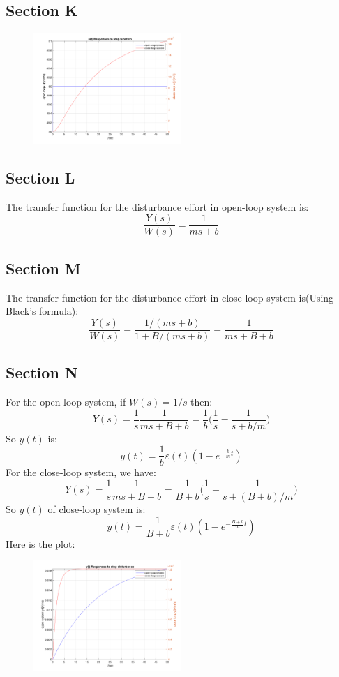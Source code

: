 \documentclass[a4paper]{article}
\begin{document}
\subsection{Section K}
\begin{figure}[H]
\centering
\includegraphics[width = 0.5\textwidth]{pic/k.png}
\end{figure}

\subsection{Section L}
The transfer function for the disturbance effort in open-loop system is:
$$
\frac{Y(s)}{W(s)} = \frac{1}{ms+b}
$$

\subsection{Section M}
The transfer function for the disturbance effort in close-loop system is(Using Black's formula):
$$
\frac{Y(s)}{W(s)} = \frac{1/(ms+b)}{1+B/(ms+b)} = \frac{1}{ms+B+b}
$$

\subsection{Section N}
For the open-loop system, if $W(s) = 1/s$ then:
$$
Y(s) = \frac1s\frac{1}{ms+B+b} = \frac{1}{b}\Big(\frac 1s -\frac{1}{s+b/m}\Big)
$$
So $y(t)$ is:
$$
y(t) = \frac 1b\varepsilon(t)(1-e^{-\frac bm t})
$$
For the close-loop system, we have:
$$
Y(s) = \frac 1s\frac{1}{ms+B+b} = \frac{1}{B+b} \Big(\frac 1s -\frac{1}{s+(B+b)/m}\Big)
$$
So $y(t)$ of close-loop system is:
$$
y(t) = \frac{1}{B+b}\varepsilon(t)(1-e^{-\frac {B+b}{m}t})
$$
Here is the plot:
\begin{figure}[H]
\centering
\includegraphics[width = 0.5\textwidth]{pic/n.png}
\end{figure}
\end{document}
